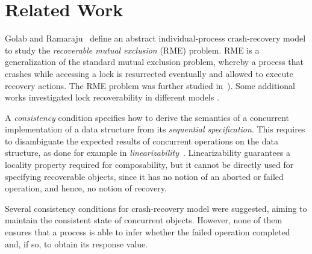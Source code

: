 \section{Related Work}
\label{sec:related}

Golab and Ramaraju~\cite{GolabR16} define an abstract individual-process crash-recovery model to study the \emph{recoverable mutual exclusion} (RME) problem. RME is a generalization of the standard mutual exclusion problem, whereby a process that crashes while accessing a lock is resurrected eventually and allowed to execute recovery actions. %
The RME problem was further studied in~\cite{DBLP:conf/podc/GolabH17,DBLP:conf/wdag/JayantiJ17}). Some additional works investigated lock recoverability in different models \cite{DBLP:journals/tcs/AbrahamDHK01,DBLP:conf/spdp/BohannonLS96,DBLP:conf/spdp/BohannonLS0G95,DBLP:conf/oopsla/ChakrabartiBB14,Taubenfeld:2006:SAC:1211700}.

A \emph{consistency} condition specifies how to derive the semantics
of a concurrent implementation of a data structure from its
\emph{sequential specification}.
This requires to disambiguate the expected results of concurrent
operations on the data structure, as done for example in
\emph{linearizability}~\cite{herlihyWingLinearizability}.
Linearizability guarantees a locality property required for composability,
but it cannot be directly used for specifying recoverable objects,
since it has no notion of an aborted or failed operation, and hence, no notion of recovery.

Several consistency conditions for crash-recovery model were suggested,
aiming to maintain the consistent state of concurrent objects.
However, none of them ensures that a process is able to infer
whether the failed operation completed and, if so, to obtain its response value.

